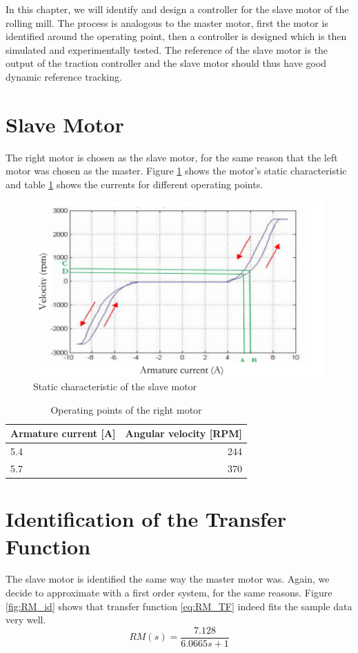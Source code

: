 In this chapter, we will identify and design a controller for the slave motor of the rolling mill. The process is analogous to the master motor, first the motor is identified around the operating point, then a controller is designed which is then simulated and experimentally tested. The reference of the slave motor is the output of the traction controller and the slave motor should thus have good dynamic reference tracking.

\section{Slave Motor}
The right motor is chosen as the slave motor, for the same reason that the left motor was chosen as the master. Figure \ref{fig:RM_RPM_curr} shows the motor's static characteristic and table \ref{tab:RM_operating_region} shows the currents for different operating points.

\begin{figure}[htbp]
\centering
\includegraphics[width = .7\textwidth]{pics/RM_RPM_Current.png}
\caption{Static characteristic of the slave motor}
\label{fig:RM_RPM_curr}
\end{figure}

\begin{table}[H]
	\centering
		\begin{tabular}{lr}
        \toprule
			Armature current [A] & Angular velocity [RPM] \\ \midrule
            5.4 & 244 \\
            5.7 & 370 \\\bottomrule
		\end{tabular}
	\caption{Operating points of the right motor}
	\label{tab:RM_operating_region}
\end{table}

\FloatBarrier

\section{Identification of the Transfer Function}
The slave motor is identified the same way the master motor was. Again, we decide to approximate with a first order system, for the same reasons. Figure \ref{fig:RM_id} shows that transfer function \ref{eq:RM_TF} indeed fits the sample data very well.
\begin{equation}
	RM(s) = \frac{7.128}{6.0665s+1}
    \label{eq:RM_TF}
\end{equation}

